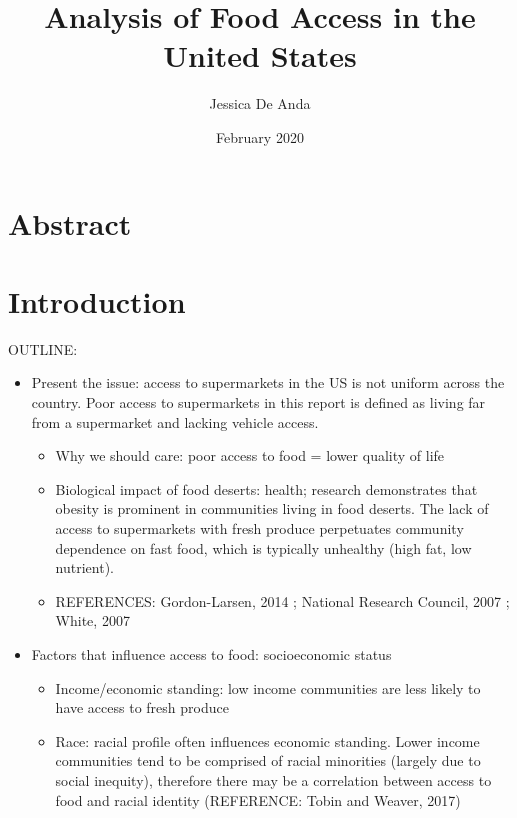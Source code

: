 \documentclass[letterpaper]{article} %
\title{Analysis of Food Access in the United States}
\author{Jessica De Anda}
\date{February 2020}
\begin{document}
\maketitle
\section*{Abstract}

\newpage
\tableofcontents
\listoffigures

\newpage
\section{Introduction}

OUTLINE:

\begin{itemize} \itemsep -.1cm
	\item Present the issue: access to supermarkets in the US is not uniform across the country. Poor access to supermarkets in this report is defined as living far from a supermarket and lacking vehicle access.
		\begin{itemize}\itemsep -.1cm\vspace{-.25cm}
			\item Why we should care: poor access to food = lower quality of life
			\item Biological impact of food deserts: health; research demonstrates that obesity is prominent in communities living in food deserts. The lack of access to supermarkets with fresh produce perpetuates community dependence on fast food, which is typically unhealthy (high fat, low nutrient).
			\item REFERENCES: Gordon-Larsen, 2014 ; National Research Council, 2007 ; White, 2007
		\end{itemize}
	\item Factors that influence access to food: socioeconomic status
		\begin{itemize}\itemsep -.1cm\vspace{-.25cm}
			\item Income/economic standing: low income communities are less likely to have access to fresh produce
			\item Race: racial profile often influences economic standing. Lower income communities tend to be comprised of racial minorities (largely due to social inequity), therefore there may be a correlation between access to food and racial identity (REFERENCE: Tobin and Weaver, 2017)

\end{itemize}
\end{itemize}
\end{document}
